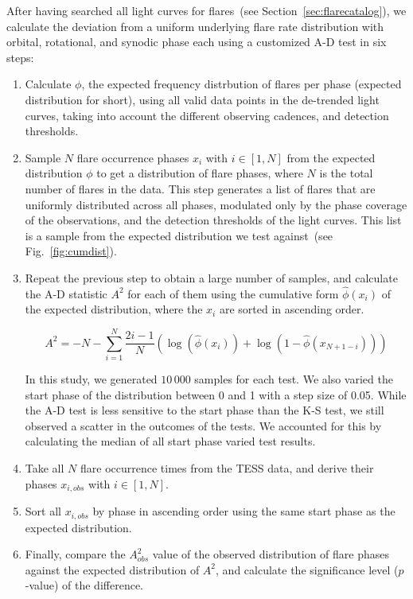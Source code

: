\documentclass[fleqn,usenatbib]{mnras}%
\begin{document}
After having searched all light curves for flares~(see Section~\ref{sec:flarecatalog}), we calculate the deviation from a uniform underlying flare rate distribution with orbital, rotational, and synodic phase each using a customized A-D test in six steps:
\begin{enumerate}
\item Calculate $\phi$, the expected frequency distrbution of flares per phase (expected distribution for short), using all valid data points in the de-trended light curves, taking into account the different observing cadences, and detection thresholds.
\item Sample $N$ flare occurrence phases $x_i$ with $i \in [1,N]$ from the expected distribution $\phi$ to get a distribution of flare phases, where $N$ is the total number of flares in the data. This step generates a list of flares that are uniformly distributed across all phases, modulated only by the phase coverage of the observations, and the detection thresholds of the light curves. This list is a sample from the expected distribution we test against~(see Fig.~\ref{fig:cumdist}).
\item Repeat the previous step to obtain a large number of samples, and calculate the A-D statistic $A^2$ for each of them using the cumulative form $\hat{\phi}(x_i)$ of the expected distribution, where the $x_i$ are sorted in ascending order. 

\begin{equation}
A^2 = - N -\displaystyle\sum_{i=1}^N \dfrac{2i-1}{N}\left(\log(\hat{\phi}(x_i))+\log(1-\hat{\phi}(x_{N+1-i}))\right)
\end{equation}

In this study, we generated $10\,000$ samples for each test. We also varied the start phase of the distribution between 0 and 1 with a step size of 0.05. While the A-D test is less sensitive to the start phase than the K-S test, we still observed a scatter in the outcomes of the tests. We accounted for this by calculating the median of all start phase varied test results.
\item Take all $N$ flare occurrence times from the TESS data, and derive their phases $x_{i,obs}$ with $i \in [1,N]$. 
\item Sort all $x_{i,obs}$ by phase in ascending order using the same start phase as the expected distribution.
\item Finally, compare the $A^2_{obs}$ value of the observed distribution of flare phases against the expected distribution of $A^2$, and calculate the significance level ($p$-value) of the difference. 
\end{enumerate}
\end{document}
